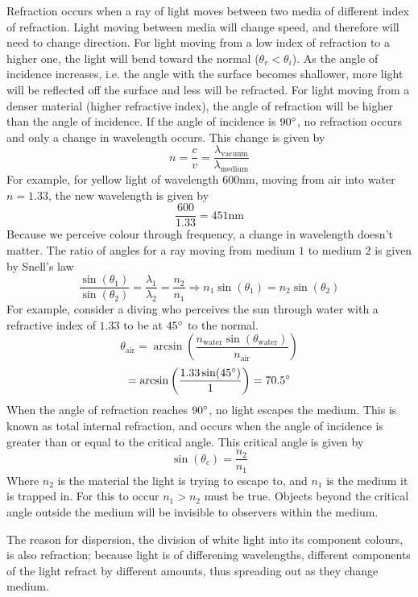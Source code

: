 \documentclass[12pt]{report}
\begin{document}
\begin{flushleft}
\bigskip
Refraction occurs when a ray of light moves between two media of different 
index of refraction. Light moving between media will change speed, and 
therefore will need to change direction. For light moving from a low index of
refraction to a higher one, the light will bend toward the normal 
(\(\theta_r < \theta_i\)). As the angle of incidence increases, i.e. the angle
with the surface becomes shallower, more light will be reflected off the 
surface and less will be refracted. For light moving from a denser material
(higher refractive index), the angle of refraction will be higher than the
angle of incidence. If the angle of incidence is \(90\degree\), no refraction
occurs and only a change in wavelength occurs. This change is given by
\[n = \frac{c}{v} = \frac{\lambda_\mathrm{vacuum}}{\lambda_\mathrm{medium}}\]
For example, for yellow light of wavelength \(600\mathrm{nm}\), moving from
air into water \(n = 1.33\), the new wavelength is given by
\[\frac{600}{1.33} = 451\mathrm{nm}\]
Because we perceive colour through frequency, a change in wavelength doesn't
matter. The ratio of angles for a ray moving from medium \(1\) to medium \(2\)
is given by Snell's law
\[\frac{\sin(\theta_1)}{\sin(\theta_2)} = \frac{\lambda_1}{\lambda_2} 
= \frac{n_2}{n_1} \Rightarrow n_1\sin(\theta_1) = n_2\sin(\theta_2)\]
For example, consider a diving who perceives the sun through water with a
refractive index of \(1.33\) to be at \(45\degree\) to the normal.
\[\theta_\mathrm{air} = \arcsin\left(\frac{n_\mathrm{water}
\sin(\theta_\mathrm{water})}{n_\mathrm{air}}\right)\]
\[= \arcsin\left(\frac{1.33\sin(45\degree)}{1}\right) = 70.5\degree\]
When the angle of refraction reaches \(90\degree\), no light escapes the 
medium. This is known as total internal refraction, and occurs when the
angle of incidence is greater than or equal to the critical angle. This
critical angle is given by
\[\sin(\theta_c) = \frac{n_2}{n_1}\]
Where \(n_2\) is the material the light is trying to escape to, and \(n_1\) is
the medium it is trapped in. For this to occur \(n_1 > n_2\) must be true.
Objects beyond the critical angle outside the medium will be invisible to 
observers within the medium.

\bigskip
The reason for dispersion, the division of white light into its component
colours, is also refraction; because light is of differening wavelengths,
different components of the light refract by different amounts, thus spreading
out as they change medium.

\end{flushleft}
\end{document}

